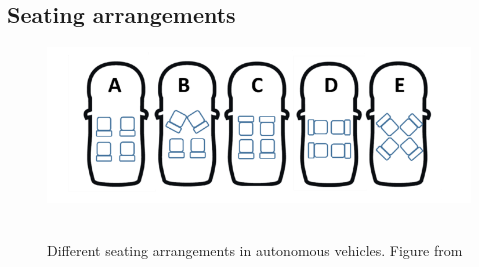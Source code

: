 \subsection{Seating arrangements }\label{ssec:seating}
\begin{figure}
    \includegraphics[width=1\textwidth]{fig/seating}\hfill\
    \caption[Seating arrangements]{Different seating arrangements in autonomous vehicles. Figure from \cite{Jorlov2017}}
    \label{fig:seating}
\end{figure}
